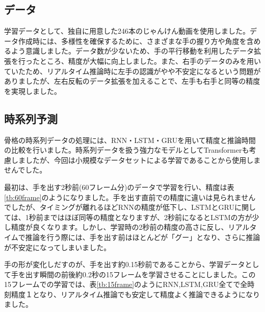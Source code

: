 \subsection{データ}
学習データとして、独自に用意した246本のじゃんけん動画を使用しました。データ作成時には、多様性を確保するために、さまざまな手の握り方や角度を含めるよう意識しました。データ数が少ないため、手の平行移動を利用したデータ拡張を行ったところ、精度が大幅に向上しました。また、右手のデータのみを用いていたため、リアルタイム推論時に左手の認識がやや不安定になるという問題がありましたが、左右反転のデータ拡張を加えることで、左手も右手と同等の精度を実現しました。

\subsection{時系列予測}
骨格の時系列データの処理には、RNN・LSTM・GRUを用いて精度と推論時間の比較を行いました。時系列データを扱う強力なモデルとしてTransformerも考慮しましたが、今回は小規模なデータセットによる学習であることから使用しませんでした。

最初は、手を出す2秒前(60フレーム分)のデータで学習を行い、精度は表\ref{tb:60frame}のようになりました。手を出す直前での精度に違いは見られませんでしたが、タイミングが離れるほどRNNの精度が低下し、LSTMとGRUに関しては、1秒前まではほぼ同等の精度となりますが、2秒前になるとLSTMの方が少し精度が良くなります。しかし、学習時の2秒前の精度の高さに反し、リアルタイムで推論を行う際には、手を出す前はほとんどが「グー」となり、さらに推論が不安定になってしまいました。

手の形が変化しだすのが、手を出す約0.15秒前であることから、学習データとして手を出す瞬間の前後約0.2秒の15フレームを学習させることにしました。この15フレームでの学習では、表\ref{tb:15frame}のようにRNN,LSTM,GRU全てで全時刻精度１となり、リアルタイム推論でも安定して精度よく推論できるようになりました。

